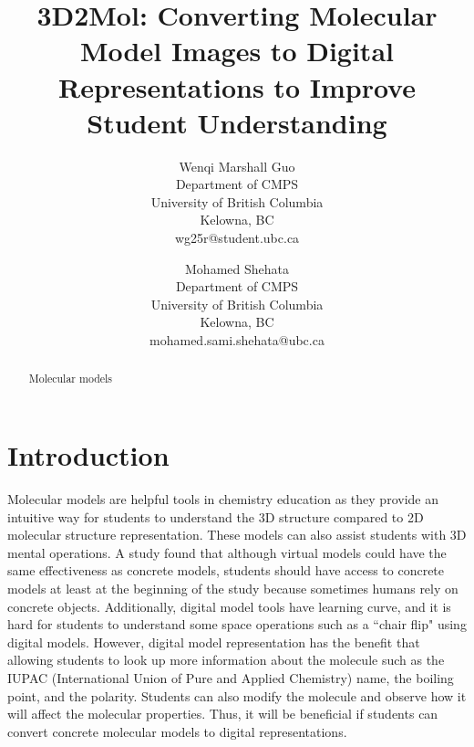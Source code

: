 \documentclass[12pt]{article}
\begin{document}
\title{3D2Mol: Converting Molecular Model Images to Digital Representations to Improve Student Understanding}


\author{Wenqi Marshall Guo\\
Department of CMPS\\
University of British Columbia\\
Kelowna, BC\\
wg25r@student.ubc.ca 
\and
Mohamed Shehata\\
Department of CMPS\\
University of British Columbia\\
Kelowna, BC\\
mohamed.sami.shehata@ubc.ca
}

\maketitle


\begin{abstract}
Molecular models 
\end{abstract}


\section{Introduction}
Molecular models are helpful tools in chemistry education as they provide an intuitive way for students to understand the 3D structure compared to 2D molecular structure representation. These models can also assist students with 3D mental operations. 
A study \autocite{savec_evaluating_2005} found that although virtual models could have the same effectiveness as concrete models, students should have access to concrete models at least at the beginning of the study because sometimes humans rely on concrete objects. Additionally, digital model tools have learning curve, and it is hard for students to understand some space operations such as a ``chair flip" using digital models. 
However, digital model representation has the benefit that allowing students to look up more information about the molecule such as the IUPAC (International Union of Pure and Applied Chemistry) name, the boiling point, and the polarity. Students can also modify the molecule and observe how it will affect the molecular properties. Thus, it will be beneficial if students can convert concrete molecular models to digital representations. 
\end{document}
